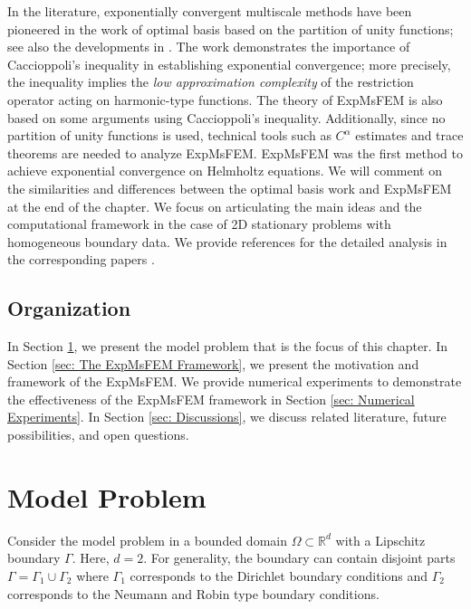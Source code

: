 \documentclass[12pt]{caltech_thesis}
\numberwithin{equation}{section}
\begin{document}
In the literature, exponentially convergent multiscale methods have been pioneered in the work of optimal basis \cite{babuska2011optimal} based on the partition of unity functions; see also the developments in \cite{smetana2016optimal,buhr2018randomized,chen2020randomized,babuvska2020multiscale, schleuss2020optimal, ma2021error, ma2021novel}. The work demonstrates the importance of Caccioppoli's inequality in establishing exponential convergence; more precisely, the inequality implies the \textit{low approximation complexity} of the restriction operator acting on harmonic-type functions. The theory of ExpMsFEM is also based on some arguments using Caccioppoli's inequality. Additionally, since no partition of unity functions is used, technical tools such as $C^{\alpha}$ estimates and trace theorems are needed to analyze ExpMsFEM. ExpMsFEM was the first method to achieve exponential convergence on Helmholtz equations. We will comment on the similarities and differences between the optimal basis work and ExpMsFEM at the end of the chapter. We focus on articulating the main ideas and the computational framework in the case of 2D stationary problems with homogeneous boundary data. We provide references for the detailed analysis in the corresponding papers \cite{chen2021exponential, chen2023exponentially}.

\subsection{Organization} In Section \ref{sec: model problem}, we present the model problem that is the focus of this chapter. In Section \ref{sec: The ExpMsFEM Framework}, we present the motivation and framework of the ExpMsFEM. We provide numerical experiments to demonstrate the effectiveness of the ExpMsFEM framework in Section \ref{sec: Numerical Experiments}. In Section \ref{sec: Discussions}, we discuss related literature, future possibilities, and open questions. 

\section{Model Problem}
\label{sec: model problem}
Consider the model problem in a bounded domain $\Omega \subset \mathbb{R}^d$ with a Lipschitz boundary $\Gamma$. Here, $d=2$. For generality, the boundary can contain disjoint parts $\Gamma = \Gamma_1\cup \Gamma_2$ where $\Gamma_1$ corresponds to the Dirichlet boundary conditions and $\Gamma_2$ corresponds to the Neumann and Robin type boundary conditions. 
\end{document}
